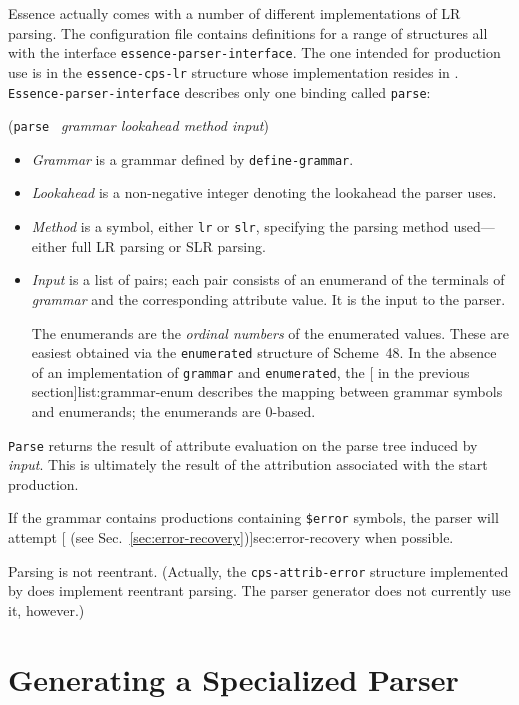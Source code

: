 \documentclass{article}
\renewcommand{\var}[1]{\noindent\mbox{\textit{#1}}}
\newcommand{\ide}[1]{{\frenchspacing\textnormal{\texttt{#1}}}}
\newcommand{\pproto}[2]{\unskip%
\mbox{\texonly{\spaceskip=0.5em}#1}%
\mbox{ }\texonly{\nobreak}\htmlonly{ }\textrm{#2}}
\newcommand{\proto}[3]{\par\bigskip\begin{flushleft}\pproto{(\texttt{#1}}{\textit{#2})}\hspace*{\fill}{#3}\end{flushleft}}
\newcommand{\codefont}[1]{\texttt{#1}}
\begin{document}
Essence actually comes with a number of different implementations of
LR parsing.  The  configuration file contains
definitions for a range of structures all with the interface
\codefont{essence-parser-interface}.  The one intended for production use is in the
\codefont{essence-cps-lr} structure whose implementation resides in
.  \codefont{Essence-parser-interface} describes only 
one binding called \codefont{parse}:

\label{proc:parse}
\proto{parse}{grammar lookahead method input}{procedure}
%
\begin{itemize}
\item \var{Grammar} is a grammar defined by \codefont{define-grammar}.
\item \var{Lookahead} is a non-negative integer denoting the
  lookahead the parser uses.
\item \var{Method} is a symbol, either \codefont{lr} or
  \codefont{slr}, specifying the parsing method used---either full LR
  parsing or SLR parsing.
\item \var{Input} is a list of pairs; each pair consists of an enumerand of the
  terminals of \var{grammar} and the corresponding attribute value.  It is the
  input to the parser. 
  
  The enumerands are the \emph{ordinal numbers} of the enumerated
  values.  These are easiest obtained via the \codefont{enumerated} structure
  of Scheme~48.  In the absence of an implementation of \codefont{grammar} and
  \codefont{enumerated}, the [ in the previous
  section]{list:grammar-enum} describes the mapping between grammar symbols and
  enumerands; the enumerands are 0-based.
\end{itemize}
%
\ide{Parse} returns the result of attribute evaluation on the parse
tree induced by \var{input}.  This is ultimately the result of the
attribution associated with the start production.

If the grammar contains productions containing \codefont{\$error}
symbols, the parser will attempt [ (see
Sec.~\ref{sec:error-recovery})]{sec:error-recovery} when possible.

Parsing is not reentrant.  (Actually, the \codefont{cps-attrib-error}
structure implemented by  does
implement reentrant parsing.  The parser generator does not currently
use it, however.)

\section{Generating a Specialized Parser}
\label{sec:parser-generation}
\end{document}
